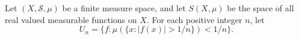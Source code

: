 Let $(X, \mathcal{S}, \mu)$ be a finite measure space, and let $S(X, \mu)$ be the space of all real valued measurable functions on $X$. For each positive integer $n$, let
$$
U_n = \{ f : \mu(\{ x : |f(x)| > 1/n \}) < 1/n \}.
$$
